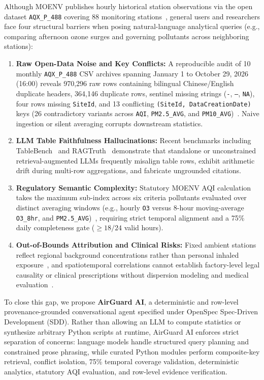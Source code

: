 \documentclass[conference]{IEEEtran}
\begin{document}
Although MOENV publishes hourly historical station observations via the open dataset \texttt{AQX\_P\_488} covering 88 monitoring stations~\cite{moenv_aqx_p_488,moenv_aqi_def}, general users and researchers face four structural barriers when posing natural-language analytical queries (e.g., comparing afternoon ozone surges and governing pollutants across neighboring stations):
\begin{enumerate}
    \item \textbf{Raw Open-Data Noise and Key Conflicts:} A reproducible audit of 10 monthly \texttt{AQX\_P\_488} CSV archives spanning January 1 to October 29, 2026 (16:00) reveals 970,296 raw rows containing bilingual Chinese/English duplicate headers, 364,146 duplicate rows, sentinel missing strings (\texttt{-}, \texttt{--}, \texttt{NA}), four rows missing \texttt{SiteId}, and 13 conflicting \texttt{(SiteId, DataCreationDate)} keys (26 contradictory variants across \texttt{AQI}, \texttt{PM2.5\_AVG}, and \texttt{PM10\_AVG})~\cite{moenv_aqx_p_488}. Naive ingestion or silent averaging corrupts downstream statistics.
    \item \textbf{LLM Table Faithfulness Hallucinations:} Recent benchmarks including TableBench~\cite{wu2024tablebench} and RAGTruth~\cite{niu2024ragtruth} demonstrate that standalone or unconstrained retrieval-augmented LLMs frequently misalign table rows, exhibit arithmetic drift during multi-row aggregations, and fabricate ungrounded citations.
    \item \textbf{Regulatory Semantic Complexity:} Statutory MOENV AQI calculation takes the maximum sub-index across six criteria pollutants evaluated over distinct averaging windows (e.g., hourly \texttt{O3} versus 8-hour moving-average \texttt{O3\_8hr}, and \texttt{PM2.5\_AVG})~\cite{moenv_aqi_def}, requiring strict temporal alignment and a 75\% daily completeness gate ($\ge 18/24$ valid hours).
    \item \textbf{Out-of-Bounds Attribution and Clinical Risks:} Fixed ambient stations reflect regional background concentrations rather than personal inhaled exposure~\cite{usepa_siting,who2025summary}, and spatiotemporal correlations cannot establish factory-level legal causality or clinical prescriptions without dispersion modeling and medical evaluation~\cite{ma2026neuroair}.
\end{enumerate}

To close this gap, we propose \textbf{AirGuard AI}, a deterministic and row-level provenance-grounded conversational agent specified under OpenSpec Spec-Driven Development (SDD). Rather than allowing an LLM to compute statistics or synthesize arbitrary Python scripts at runtime, AirGuard AI enforces strict separation of concerns: language models handle structured query planning and constrained prose phrasing, while curated Python modules perform composite-key retrieval, conflict isolation, 75\% temporal coverage validation, deterministic analytics, statutory AQI evaluation, and row-level evidence verification.
\end{document}
